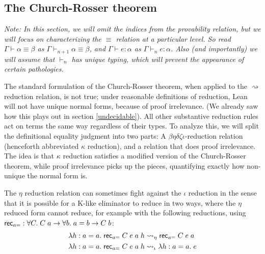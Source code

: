 \subsection{The Church-Rosser theorem}
\emph{Note: In this section, we will omit the indices from the provability relation, but we will focus on characterizing the $\equiv$ relation at a particular level. So read $\Gamma\vdash \alpha\equiv\beta$ as $\Gamma\vdash_{n+1} \alpha\equiv\beta$, and $\Gamma\vdash e:\alpha$ as $\Gamma\vdash_n e:\alpha$. Also (and importantly) we will assume that $\vdash_n$ has unique typing, which will prevent the appearance of certain pathologies.}

The standard formulation of the Church-Rosser theorem, when applied to the $\rightsquigarrow$ reduction relation, is not true; under reasonable definitions of reduction, Lean will not have unique normal forms, because of proof irrelevance. (We already saw how this plays out in section \ref{undecidable}). All other substantive reduction rules act on terms the same way regardless of their types. To analyze this, we will split the definitional equality judgment into two parts: A $\beta\eta\delta\zeta\iota$-reduction relation (henceforth abbreviated $\kappa$ reduction), and a relation that does proof irrelevance. The idea is that $\kappa$ reduction satisfies a modified version of the Church-Rosser theorem, while proof irrelevance picks up the pieces, quantifying exactly how non-unique the normal form is.

The $\eta$ reduction relation can sometimes fight against the $\iota$ reduction in the sense that it is possible for a K-like eliminator to reduce in two ways, where the $\eta$ reduced form cannot reduce, for example with the following reductions, using $\mathsf{rec}_{a=}:\forall C.\;C\;a\to \forall b.\;a=b\to C\;b$:
\begin{align*}
&\lambda h:a=a.\;\mathsf{rec}_{a=}\;C\;e\;a\;h\rightsquigarrow_\eta\mathsf{rec}_{a=}\;C\;e\;a\\
&\lambda h:a=a.\;\mathsf{rec}_{a=}\;C\;e\;a\;h\rightsquigarrow_\iota\lambda h:a=a.\;e
\end{align*}


